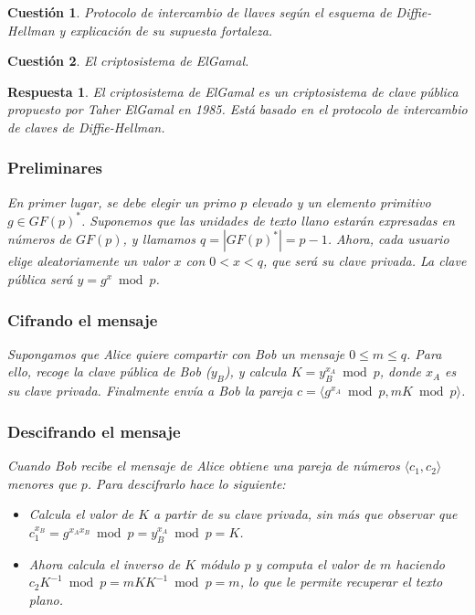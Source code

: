 \documentclass[
  a4paper,
  spanish,
  12pt,
]{scrartcl}
\theoremstyle{ejercicio-style}
\newtheorem{ejer}{Cuestión}
\theoremstyle{remark-style}
\newtheorem*{sol}{Respuesta}
\theoremstyle{teorema-style}
\begin{document}
\begin{ejer}
  Protocolo de intercambio de llaves según el esquema de Diffie-Hellman y explicación de su supuesta fortaleza.
\end{ejer}

\begin{ejer}
  El criptosistema de ElGamal.
\end{ejer}

\begin{sol}
El criptosistema de ElGamal es un criptosistema de clave pública propuesto por Taher ElGamal en 1985. Está basado en el protocolo de intercambio de claves de Diffie-Hellman.

\subsubsection*{Preliminares}

En primer lugar, se debe elegir un primo $p$ elevado y un elemento primitivo $g \in GF(p)^\ast$. Suponemos que las unidades de texto llano estarán expresadas en números de $GF(p)$, y llamamos $q = |GF(p)^\ast| = p -1$. Ahora, cada usuario elige aleatoriamente un valor $x$ con $0 < x < q$, que será su clave privada. La clave pública será $y = g^x \bmod p$.

\subsubsection*{Cifrando el mensaje}

Supongamos que Alice quiere compartir con Bob un mensaje \(0\leq m \leq q\). Para ello, recoge la clave pública de Bob ($y_B$), y calcula $K = y_B ^{x_A} \bmod p$, donde $x_A$ es su clave privada. Finalmente envía a Bob la pareja \(c = \langle g^{x_{A}} \bmod{p}, mK \bmod p\rangle\).

\subsubsection*{Descifrando el mensaje}

Cuando Bob recibe el mensaje de Alice obtiene una pareja de números $\langle c_1, c_2 \rangle$ menores que $p$. Para descifrarlo hace lo siguiente:

\begin{itemize}
  \item Calcula el valor de $K$ a partir de su clave privada, sin más que observar que $c_1^{x_B} = g^{x_Ax_B} \bmod p = y_B^{x_A} \bmod p = K$.
  \item Ahora calcula el inverso de $K$ módulo $p$ y computa el valor de $m$ haciendo $c_2K^{-1} \bmod p = mKK^{-1} \bmod p = m$, lo que le permite recuperar el texto plano.
\end{itemize}


\end{sol}
\end{document}
